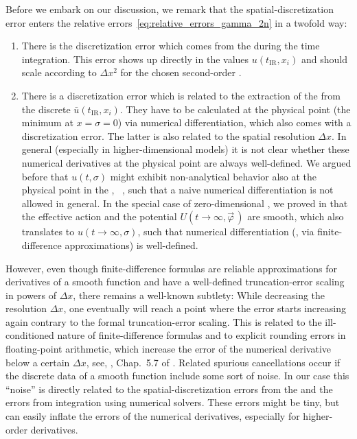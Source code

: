 Before we embark on our discussion, we remark that the spatial-discretization error enters the relative errors~\eqref{eq:relative_errors_gamma_2n} in a twofold way: 
\begin{enumerate}
	\item	There is the discretization error which comes from the \ktScheme{} during the \frg{} time integration.
	This error shows up directly in the \ir{} values $u ( t_\mathrm{IR}, x_i )$ and should scale according to $\Delta x^2$ for the chosen second-order \ktScheme{}.

	\item	There is a discretization error which is related to the extraction of the \ipi{} \nptFunctions{} from the discrete $\bar{u} ( t_\mathrm{IR}, x_i )$. 
	They have to be calculated at the physical point (the minimum at $x = \sigma = 0$) via numerical differentiation, which also comes with a discretization error.
	The latter is also related to the spatial resolution $\Delta x$.
	In general (especially in higher-dimensional models) it is not clear whether these numerical derivatives at the physical point are always well-defined.
	We argued before that $u ( t, \sigma )$ might exhibit non-analytical behavior also at the physical point in the \ir{}, \cf{}\ , such that a naive numerical differentiation is not allowed in general.
	In the special case of zero-dimensional \qfts{}, we proved in \MWApp{} that the \ir{} effective action and the \ir{} potential $U ( t \rightarrow \infty, \vec{\varphi}\, )$ are smooth, which also translates to $u ( t \rightarrow \infty, \sigma )$, such that numerical differentiation (\eg{}, via finite-difference approximations) is well-defined.
\end{enumerate}
However, even though finite-difference formulas are reliable approximations for derivatives of a smooth function and have a well-defined truncation-error scaling in powers of $\Delta x$, there remains a well-known subtlety: While decreasing the resolution $\Delta x$, one eventually will reach a point where the error starts increasing again contrary to the formal truncation-error scaling. 
This is related to the ill-conditioned nature of finite-difference formulas and to explicit rounding errors in floating-point arithmetic, which increase the error of the numerical derivative below a certain $\Delta x$, see, \eg{}, Chap.~5.7 of .
Related spurious cancellations occur if the discrete data of a smooth function include some sort of noise.
In our case this ``noise'' is directly related to the spatial-discretization errors from the \ktScheme{} and the errors from \rgtime{} integration using numerical \ode{} solvers.
These errors might be tiny, but can easily inflate the errors of the numerical derivatives, especially for higher-order derivatives.

